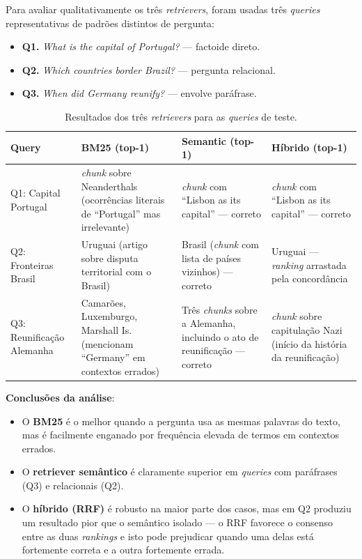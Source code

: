 \documentclass[11pt,a4paper]{article}
\begin{document}
Para avaliar qualitativamente os três \emph{retrievers}, foram usadas três \emph{queries} representativas de padrões distintos de pergunta:

\begin{itemize}[noitemsep]
    \item \textbf{Q1.} \emph{What is the capital of Portugal?} --- factoide direto.
    \item \textbf{Q2.} \emph{Which countries border Brazil?} --- pergunta relacional.
    \item \textbf{Q3.} \emph{When did Germany reunify?} --- envolve paráfrase.
\end{itemize}

\begin{table}[h]
\centering
\small
\begin{tabular}{lp{3.5cm}p{3.5cm}p{3.5cm}}
\toprule
\textbf{Query} & \textbf{BM25 (top-1)} & \textbf{Semantic (top-1)} & \textbf{Híbrido (top-1)} \\
\midrule
Q1: Capital Portugal & \emph{chunk} sobre Neanderthals (ocorrências literais de ``Portugal'' mas irrelevante) & \emph{chunk} com ``Lisbon as its capital'' --- correto & \emph{chunk} com ``Lisbon as its capital'' --- correto \\
\midrule
Q2: Fronteiras Brasil & Uruguai (artigo sobre disputa territorial com o Brasil) & Brasil (\emph{chunk} com lista de países vizinhos) --- correto & Uruguai --- \emph{ranking} arrastada pela concordância \\
\midrule
Q3: Reunificação Alemanha & Camarões, Luxemburgo, Marshall Is. (mencionam ``Germany'' em contextos errados) & Três \emph{chunks} sobre a Alemanha, incluindo o ato de reunificação --- correto & \emph{chunk} sobre capitulação Nazi (início da história da reunificação) \\
\bottomrule
\end{tabular}
\caption{Resultados dos três \emph{retrievers} para as \emph{queries} de teste.}
\end{table}

\noindent\textbf{Conclusões da análise}:
\begin{itemize}[noitemsep]
    \item O \textbf{BM25} é o melhor quando a pergunta usa as mesmas palavras do texto, mas é facilmente enganado por frequência elevada de termos em contextos errados.
    \item O \textbf{retriever semântico} é claramente superior em \emph{queries} com paráfrases (Q3) e relacionais (Q2).
    \item O \textbf{híbrido (RRF)} é robusto na maior parte dos casos, mas em Q2 produziu um resultado pior que o semântico isolado --- o RRF favorece o consenso entre as duas \emph{rankings} e isto pode prejudicar quando uma delas está fortemente correta e a outra fortemente errada.
\end{itemize}
\end{document}
